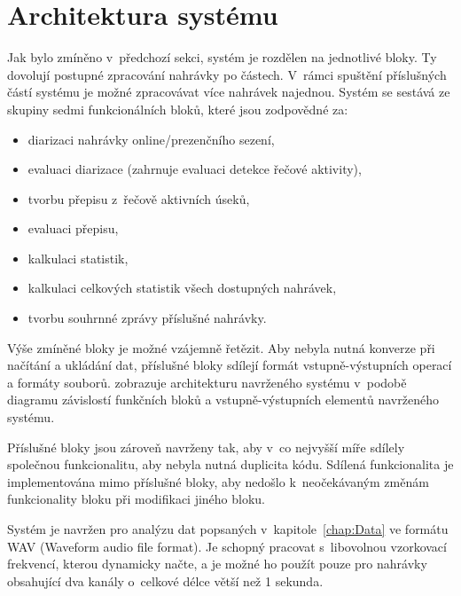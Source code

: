 
\section{Architektura systému}
\label{section:Architecture}
Jak bylo zmíněno v~předchozí sekci, systém je rozdělen na jednotlivé bloky. Ty dovolují postupné zpracování nahrávky po částech. V~rámci spuštění příslušných částí systému je možné zpracovávat více nahrávek najednou. Systém se sestává ze skupiny sedmi funkcionálních bloků, které jsou zodpovědné za:

\begin{itemize}
    \item diarizaci nahrávky online/prezenčního sezení,
    \item evaluaci diarizace (zahrnuje evaluaci detekce řečové aktivity),
    \item tvorbu přepisu z~řečově aktivních úseků,
    \item evaluaci přepisu,
    \item kalkulaci statistik,
    \item kalkulaci celkových statistik všech dostupných nahrávek,
    \item tvorbu souhrnné zprávy příslušné nahrávky.
\end{itemize}

Výše zmíněné bloky je možné vzájemně řetězit. Aby nebyla nutná konverze při načítání a ukládání dat, příslušné bloky sdílejí formát vstupně-výstupních operací a formáty souborů.  zobrazuje architekturu navrženého systému v~podobě diagramu závislostí funkčních bloků a vstupně-výstupních elementů navrženého systému.

Příslušné bloky jsou zároveň navrženy tak, aby v~co nejvyšší míře sdílely společnou funkcionalitu, aby nebyla nutná duplicita kódu. Sdílená funkcionalita je implementována mimo příslušné bloky, aby nedošlo k~neočekávaným změnám funkcionality bloku při modifikaci jiného bloku.

Systém je navržen pro analýzu dat popsaných v~kapitole~\ref{chap:Data} ve formátu WAV (Waveform audio file format). Je schopný pracovat s~libovolnou vzorkovací frekvencí, kterou dynamicky načte, a je možné ho použít pouze pro nahrávky obsahující dva kanály o~celkové délce větší než 1 sekunda.

